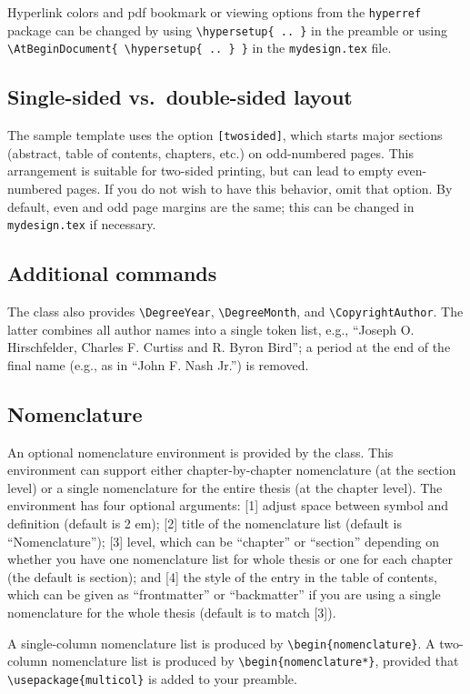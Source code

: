 \documentclass[11pt]{article}
\begin{document}
Hyperlink colors and pdf bookmark or viewing options from the \texttt{hyperref} package can be changed by using \verb|\hypersetup{ .. }| in the preamble or using \verb|\AtBeginDocument{ \hypersetup{ .. } }| in the \texttt{mydesign.tex} file.

\subsection{Single-sided vs.\ double-sided layout}
The sample template uses the option \texttt{[twosided]}, which starts major sections (abstract, table of contents, chapters, etc.) on odd-numbered pages.  This arrangement is suitable for two-sided printing, but can lead to empty even-numbered pages. If you do not wish to have this behavior, omit that option.  By default, even and odd page margins are the same; this can be changed in \texttt{mydesign.tex} if necessary.

\subsection{Additional commands}
The class also provides \verb|\DegreeYear|, \verb|\DegreeMonth|, and \verb|\CopyrightAuthor|. The latter combines all author names into a single token list, e.g., ``Joseph O. Hirschfelder, Charles F. Curtiss and R. Byron Bird''; a period at the end of the final name (e.g., as in ``John F. Nash Jr.'') is removed.

\subsection{Nomenclature}
An optional nomenclature environment is provided by the class.  This environment can support either chapter-by-chapter nomenclature (at the section level) or a single nomenclature for the entire thesis (at the chapter level). The environment has four optional arguments: [1] adjust space between symbol and definition (default is 2 em); [2] title of the nomenclature list (default is ``Nomenclature''); [3] level, which can be ``chapter'' or ``section'' depending on whether you
have one nomenclature list for whole thesis or one for each chapter (the default is section); and [4] the style of the entry in the table of contents, which can be given as ``frontmatter'' or ``backmatter'' if you are using a single nomenclature for the whole thesis (default is to match [3]).  

A single-column nomenclature list is produced by \verb|\begin{nomenclature}|. A two-column nomenclature list is produced by \verb|\begin{nomenclature*}|, provided that \verb|\usepackage{multicol}| is added to your preamble.
\end{document}
